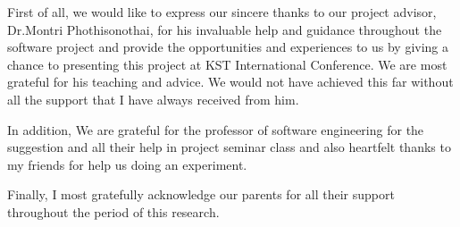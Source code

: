 \cleardoublepage


\begin{acknowledgements}

\hspace{1.5cm}First of all, we  would like to express our sincere thanks to our project advisor, Dr.Montri Phothisonothai, for his invaluable help and guidance throughout the software project and  provide the opportunities and experiences to us by giving a chance to presenting this project at KST International Conference. We are most grateful for his teaching and advice. We would not have achieved this far without all the support that I have always received from him.

\hspace{1.5cm}In addition, We are grateful for the professor of software engineering for the suggestion and all their help in project seminar class and 
also heartfelt thanks to my friends for help us doing an experiment.

\hspace{1.5cm}Finally, I most gratefully acknowledge our parents for all their support throughout the period of this research.

\end{acknowledgements}